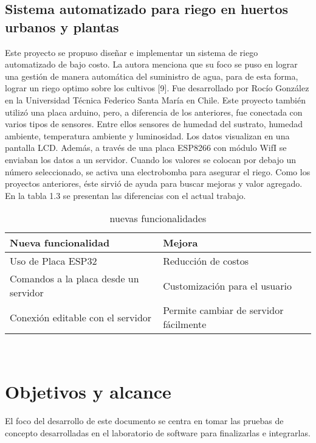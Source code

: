 \subsection{Sistema automatizado para riego en huertos urbanos y plantas}
Este proyecto se propuso diseñar e implementar un sistema de riego automatizado de bajo costo. La autora menciona que su foco se puso en lograr una gestión de manera automática del suministro de agua, para de esta forma, lograr un riego optimo sobre los cultivos [9]. Fue desarrollado por Rocío González en la Universidad Técnica Federico Santa María en Chile.
Este proyecto también utilizó una placa arduino, pero, a diferencia de los anteriores, fue conectada con varios tipos de sensores. Entre ellos sensores de humedad del sustrato, humedad ambiente, temperatura ambiente y luminosidad. Los datos visualizan en una pantalla LCD. Además, a través de una placa ESP8266 con módulo WifI se enviaban los datos a un servidor. Cuando los valores se colocan por debajo un número seleccionado, se activa una electrobomba para asegurar el riego. Como los proyectos anteriores, éste sirvió de ayuda para buscar mejoras y valor agregado. En la tabla 1.3 se presentan las diferencias con el actual trabajo.\\

\begin{table}[h]
	\centering
	\caption[Nuevas funcionalidades sobre el proyecto de Rocío González]{nuevas funcionalidades}
	\begin{tabular}{l l}    
		\toprule
		\textbf{Nueva funcionalidad} & \textbf{Mejora}\\	
		\midrule
		Uso de Placa ESP32           & Reducción de costos	\\		
		Comandos a la placa desde un servidor          & Customización para el usuario\\	
		Conexión editable con el servidor & Permite cambiar de servidor fácilmente\\	
		\bottomrule
		\hline
	\end{tabular}
	\label{tab:peces}\\
\end{table}


\section{Objetivos y alcance}
El foco del desarrollo de este documento  se centra en tomar las pruebas de concepto desarrolladas en el laboratorio de software para finalizarlas e integrarlas.

